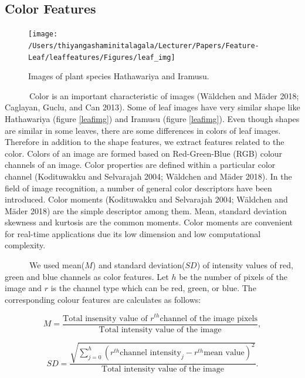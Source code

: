 \documentclass{article}
\begin{document}
\hypertarget{color-features}{%
\subsection{Color Features}\label{color-features}}

\begin{figure}[!ht]

{\centering \texttt{[image: /Users/thiyangashaminitalagala/Lecturer/Papers/Feature-Leaf/leaffeatures/Figures/leaf\_img]} 

}

\caption{\label{leafimg} Images of plant species Hathawariya and Iramusu.}\label{fig:unnamed-chunk-27}
\end{figure}

~~~~~~Color is an important characteristic of images (Wäldchen and Mäder
2018; Caglayan, Guclu, and Can 2013). Some of leaf images have very
similar shape like Hathawariya (figure \ref{leafimg}) and Iramusu
(figure \ref{leafimg}). Even though shapes are similar in some leaves,
there are some differences in colors of leaf images. Therefore in
addition to the shape features, we extract features related to the
color. Colors of an image are formed based on Red-Green-Blue (RGB)
colour channels of an image. Color properties are defined within a
particular color channel (Kodituwakku and Selvarajah 2004; Wäldchen and
Mäder 2018). In the field of image recognition, a number of general
color descriptors have been introduced. Color moments (Kodituwakku and
Selvarajah 2004; Wäldchen and Mäder 2018) are the simple descriptor
among them. Mean, standard deviation skewness and kurtosis are the
common moments. Color moments are convenient for real-time applications
due its low dimension and low computational complexity.

~~~~~~We used mean(\(M\)) and standard deviation(\(SD\)) of intensity
values of red, green and blue channels as color features. Let \(h\) be
the number of pixels of the image and \(r\) is the channel type which
can be red, green, or blue. The corresponding colour features are
calculates as follows:

\begin{equation}
    M = \frac{\text{Total insensity value of } r^{th} \text{channel of the image pixels}}{\text{Total intensity value of the image}},
\label{equa2}
\end{equation}

\begin{equation}
    SD = \frac{\sqrt{\sum_{j=0}^{h}(r^{th} \text{channel intensity}_j - r^{th} \text{mean value})^2}}{\text{Total intensity value of the image}}.
\label{equa3}
\end{equation}
\end{document}
